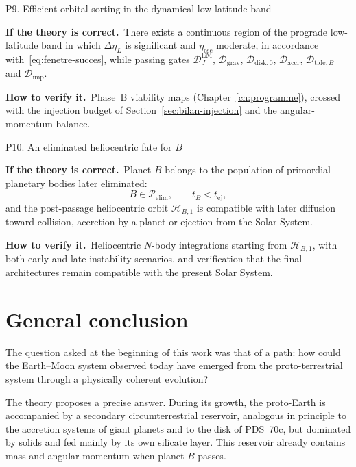 \documentclass[11pt,a4paper,openany]{report}
\newcommand{\sila}{\par\noindent\textbf{If the theory is correct.}\ }
\newcommand{\verif}{\par\smallskip\noindent\textbf{How to verify it.}\ }
\begin{document}
\begin{prediction}{P9. Efficient orbital sorting in the dynamical low-latitude band}
\sila There exists a continuous region of the prograde low-latitude band in which $\Delta\eta_L$ is
significant and $\eta_{\mathrm{esc}}$ moderate, in accordance with~\eqref{eq:fenetre-succes}, while
passing gates $\mathcal{D}_J^{\mathrm{EM}}$, $\mathcal{D}_{\mathrm{grav}}$,
$\mathcal{D}_{\mathrm{disk},0}$, $\mathcal{D}_{\mathrm{accr}}$,
$\mathcal{D}_{\mathrm{tide},B}$ and $\mathcal{D}_{\mathrm{imp}}$.
\verif Phase~B viability maps (Chapter~\ref{ch:programme}), crossed with the injection budget of
Section~\ref{sec:bilan-injection} and the angular-momentum balance.
\end{prediction}

\begin{prediction}{P10. An eliminated heliocentric fate for \texorpdfstring{$B$}{B}}
\sila Planet $B$ belongs to the population of primordial planetary bodies later eliminated:
\begin{equation}
B\in\mathcal{P}_{\mathrm{elim}},\qquad t_B<t_{\mathrm{ej}},
\label{eq:predB}
\end{equation}
and the post-passage heliocentric orbit $\mathcal{H}_{B,1}$ is compatible with later diffusion toward
collision, accretion by a planet or ejection from the Solar System.
\verif Heliocentric $N$-body integrations starting from $\mathcal{H}_{B,1}$, with both early and late
instability scenarios, and verification that the final architectures remain compatible with the
present Solar System.
\end{prediction}

\chapter*{General conclusion}

The question asked at the beginning of this work was that of a path: how could the Earth--Moon
system observed today have emerged from the proto-terrestrial system through a physically coherent
evolution?

The theory proposes a precise answer. During its growth, the proto-Earth is accompanied by a
secondary circumterrestrial reservoir, analogous in principle to the accretion systems of giant
planets and to the disk of PDS~70c, but dominated by solids and fed mainly by its own silicate
layer. This reservoir already contains mass and angular momentum when planet $B$ passes.
\end{document}
